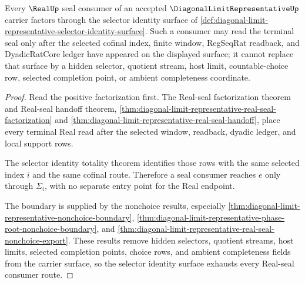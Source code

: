 \begin{theorem}
\label{thm:diagonal-limit-representative-selector-identity-real-seal-exhaustion}
Every $\RealUp$ seal consumer of an accepted $\DiagonalLimitRepresentativeUp$ carrier factors through the selector identity surface of \autoref{def:diagonal-limit-representative-selector-identity-surface}. Such a consumer may read the terminal seal only after the selected cofinal index, finite window, RegSeqRat readback, and DyadicRatCore ledger have appeared on the displayed surface; it cannot replace that surface by a hidden selector, quotient stream, host limit, countable-choice row, selected completion point, or ambient completeness coordinate.
\end{theorem}
\begin{proof}
Read the positive factorization first. The Real-seal factorization theorem and Real-seal handoff theorem, \autoref{thm:diagonal-limit-representative-real-seal-factorization} and \autoref{thm:diagonal-limit-representative-real-seal-handoff}, place every terminal Real read after the selected window, readback, dyadic ledger, and local support rows.

The selector identity totality theorem identifies those rows with the same selected index $i$ and the same cofinal route. Therefore a seal consumer reaches $e$ only through $\Sigma_i$, with no separate entry point for the Real endpoint.

The boundary is supplied by the nonchoice results, especially \autoref{thm:diagonal-limit-representative-nonchoice-boundary}, \autoref{thm:diagonal-limit-representative-phase-root-nonchoice-boundary}, and \autoref{thm:diagonal-limit-representative-real-seal-nonchoice-export}. These results remove hidden selectors, quotient streams, host limits, selected completion points, choice rows, and ambient completeness fields from the carrier surface, so the selector identity surface exhausts every Real-seal consumer route.
\end{proof}
